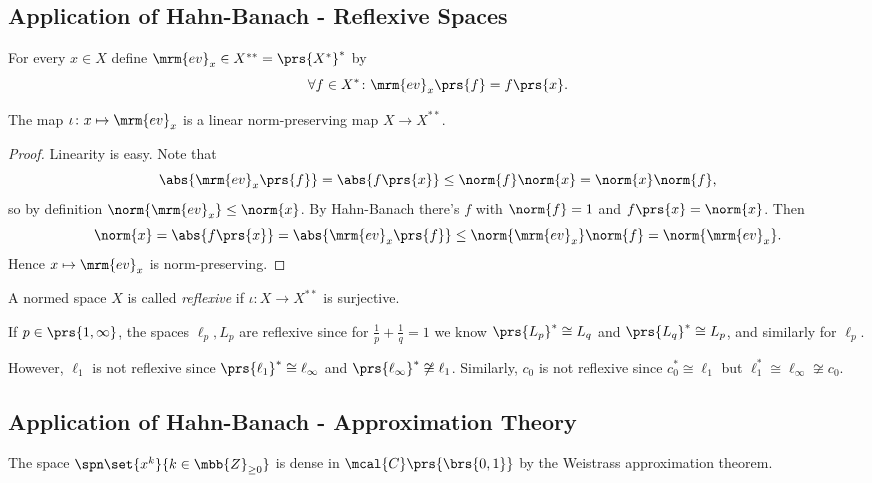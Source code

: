 \documentclass[10pt, twoside]{book}
\begin{document}
\subsection{Application of Hahn-Banach - Reflexive Spaces}

\begin{definition}
For every $x \in X$ define $\mrm{ev}_x \in X^{**} = \prs{X^*}^*$ by
\[\forall f \in X^* \colon \mrm{ev}_x\prs{f} = f\prs{x} \text{.}\]
\end{definition}

\begin{proposition}
The map $\iota \colon x \mapsto \mrm{ev}_x$ is a linear norm-preserving map $X \to X^{**}$.
\end{proposition}

\begin{proof}
Linearity is easy. Note that
\[\abs{\mrm{ev}_x\prs{f}} = \abs{f\prs{x}} \leq \norm{f} \norm{x} = \norm{x} \norm{f} \text{,}\]
so by definition $\norm{\mrm{ev}_x} \leq \norm{x}$. By Hahn-Banach there's $f$ with $\norm{f} = 1$ and $f\prs{x} = \norm{x}$. Then \[\norm{x} = \abs{f\prs{x}} = \abs{\mrm{ev}_x\prs{f}} \leq \norm{\mrm{ev}_x}\norm{f} = \norm{\mrm{ev}_x} \text{.}\]
Hence $x \mapsto \mrm{ev}_x$ is norm-preserving.
\end{proof}

\begin{definition}
A normed space $X$ is called \emph{reflexive} if $\iota \colon X \to X^{**}$ is surjective.
\end{definition}

\begin{example}
If $p \in \prs{1, \infty}$, the spaces $\ell_p, L_p$ are reflexive since for $\frac{1}{p} + \frac{1}{q} = 1$ we know $\prs{L_p}^* \cong L_q$ and $\prs{L_q}^* \cong L_p$, and similarly for $\ell_p$.

However, $\ell_1$ is not reflexive since $\prs{\ell_1}^* \cong \ell_\infty$ and $\prs{\ell_\infty}^* \not\cong \ell_1$.
Similarly, $c_0$ is not reflexive since $c_0^* \cong \ell_1$ but $\ell_1^* \cong \ell_\infty \not\cong c_0$.
\end{example}

\subsection{Application of Hahn-Banach - Approximation Theory}

\begin{example}
The space $\spn\set{x^k}{k \in \mbb{Z}_{\geq 0}}$ is dense in $\mcal{C}\prs{\brs{0,1}}$ by the Weistrass approximation theorem.
\end{example}
\end{document}
